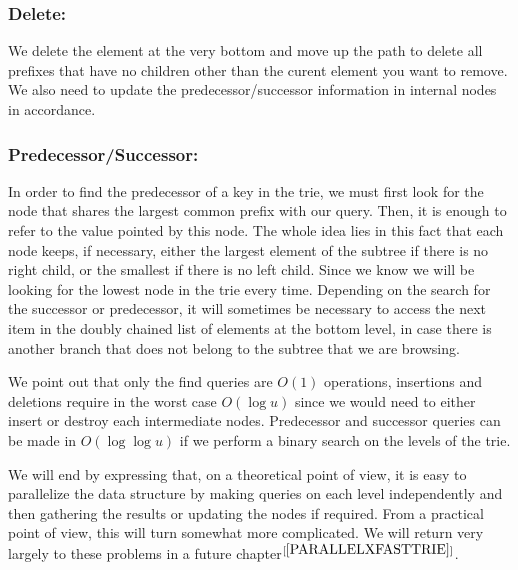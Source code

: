 \subsubsection{Delete:}
We delete the element at the very bottom and move up the path to delete all prefixes that have no children other than the curent element you want to remove. We also need to update the predecessor/successor information in internal nodes in accordance.
\subsubsection{Predecessor/Successor:}
In order to find the predecessor of a key in the trie, we must first look for the node that shares the largest common prefix with our query. Then, it is enough to refer to the value pointed by this node. The whole idea lies in this fact that each node keeps, if necessary, either the largest element of the subtree if there is no right child, or the smallest if there is no left child. Since we know we will be looking for the lowest node in the trie every time. Depending on the search for the successor or predecessor, it will sometimes be necessary to access the next item in the doubly chained list of elements at the bottom level, in case there is another branch that does not belong to the subtree that we are browsing.

We point out that only the find queries are $O(1)$ operations, insertions and deletions require in the worst case $O(\log u)$ since we would need to either insert or destroy each intermediate nodes. Predecessor and successor queries can be made in $O(\log \log u)$ if we perform a binary search on the levels of the trie.

We will end by expressing that, on a theoretical point of view, it is easy to parallelize the data structure by making queries on each level independently and then gathering the results or updating the nodes if required. From a practical point of view, this will turn somewhat more complicated. We will return very largely to these problems in a future chapter$^{[\ref{PARALLELXFASTTRIE}]}$.